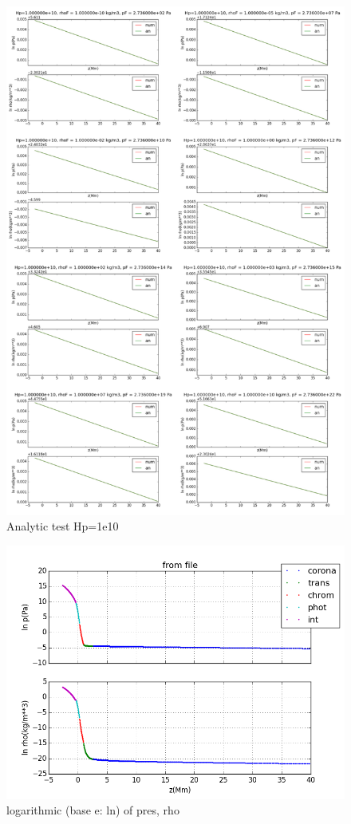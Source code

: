 \documentclass[10pt]{book}
\begin{document}
\newpage 

\begin{figure}[!ht]
 \centering
 \includegraphics[scale=0.5]{allanalytic2.png}
 \caption{Analytic test Hp=1e10}
\end{figure}

\newpage

\begin{figure}[!ht]
 \centering
 \includegraphics[scale=0.5]{fromFileLn1.png}
 \caption{logarithmic (base e: ln) of pres, rho}
\end{figure}
\end{document}
